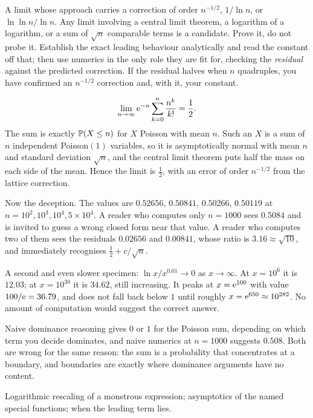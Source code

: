 \cue A limit whose approach carries a correction of order $n^{-1/2}$, $1/\ln n$, or $\ln\ln n/\ln n$. Any limit involving a central limit theorem, a logarithm of a logarithm, or a sum of $\sqrt n$ comparable terms is a candidate.
\method Prove it, do not probe it. Establish the exact leading behaviour analytically and read the constant off that; then use numerics in the only role they are fit for, checking the \emph{residual} against the predicted correction. If the residual halves when $n$ quadruples, you have confirmed an $n^{-1/2}$ correction and, with it, your constant.

\begin{worked}
\[\lim_{n\to\infty}\mathrm{e}^{-n}\sum_{k=0}^{n}\frac{n^{k}}{k!}=\frac12 .\]
The sum is exactly $\mathbb{P}(X\leq n)$ for $X$ Poisson with mean $n$. Such an $X$ is a sum of $n$ independent Poisson$(1)$ variables, so it is asymptotically normal with mean $n$ and standard deviation $\sqrt n$, and the central limit theorem puts half the mass on each side of the mean. Hence the limit is $\tfrac12$, with an error of order $n^{-1/2}$ from the lattice correction.

Now the deception. The values are $0.52656$, $0.50841$, $0.50266$, $0.50119$ at $n=10^{2},10^{3},10^{4},5\times10^{4}$. A reader who computes only $n=1000$ sees $0.5084$ and is invited to guess a wrong closed form near that value. A reader who computes two of them sees the residuals $0.02656$ and $0.00841$, whose ratio is $3.16\approx\sqrt{10}$, and immediately recognises $\tfrac12+c/\sqrt n$.

A second and even slower specimen: $\ln x/x^{0.01}\to0$ as $x\to\infty$. At $x=10^{6}$ it is $12.03$; at $x=10^{30}$ it is $34.62$, still increasing. It peaks at $x=\mathrm{e}^{100}$ with value $100/\mathrm{e}=36.79$, and does not fall back below $1$ until roughly $x=\mathrm{e}^{650}\approx10^{282}$. No amount of computation would suggest the correct answer.
\end{worked}

\begin{trap}
Naive dominance reasoning gives $0$ or $1$ for the Poisson sum, depending on which term you decide dominates, and naive numerics at $n=1000$ suggests $0.508$. Both are wrong for the same reason: the sum is a probability that concentrates at a boundary, and boundaries are exactly where dominance arguments have no content.
\end{trap}

\begin{seealsob}Logarithmic rescaling of a monstrous expression; asymptotics of the named special functions; when the leading term lies.\end{seealsob}

